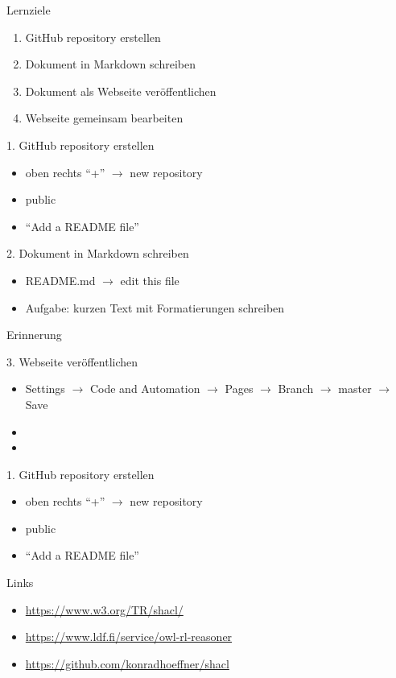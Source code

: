 \documentclass[14pt,aspectratio=1610]{beamer}
\begin{document}
\begin{frame}{Lernziele}
\begin{enumerate}
\item GitHub repository erstellen
\item Dokument in Markdown schreiben
\item Dokument als Webseite veröffentlichen
\item Webseite gemeinsam bearbeiten
\end{enumerate}
\end{frame}

\begin{frame}{1. GitHub repository erstellen}
\begin{itemize}
\item oben rechts \enquote{+} $\rightarrow$ new repository
\item public
\item \enquote{Add a README file}
\end{itemize}
\end{frame}

\begin{frame}{2. Dokument in Markdown schreiben}
\begin{itemize}
\item README.md $\rightarrow$ edit this file
\item Aufgabe: kurzen Text mit Formatierungen schreiben
\end{itemize}
\end{frame}

\begin{frame}[fragile]{Erinnerung}
\small

\end{frame}

\begin{frame}{3. Webseite veröffentlichen}
\begin{itemize}
\item Settings $\rightarrow$ Code and Automation $\rightarrow$ Pages $\rightarrow$ Branch $\rightarrow$ master $\rightarrow$ Save
\item 
\item 
\end{itemize}
\end{frame}

\begin{frame}{1. GitHub repository erstellen}
\begin{itemize}
\item oben rechts \enquote{+} $\rightarrow$ new repository
\item public
\item \enquote{Add a README file}
\end{itemize}
\end{frame}



\begin{frame}{Links}
\begin{itemize}
\item \url{https://www.w3.org/TR/shacl/}
\item \url{https://www.ldf.fi/service/owl-rl-reasoner}
\item \url{https://github.com/konradhoeffner/shacl}
\end{itemize}
\end{frame}
\end{document}
